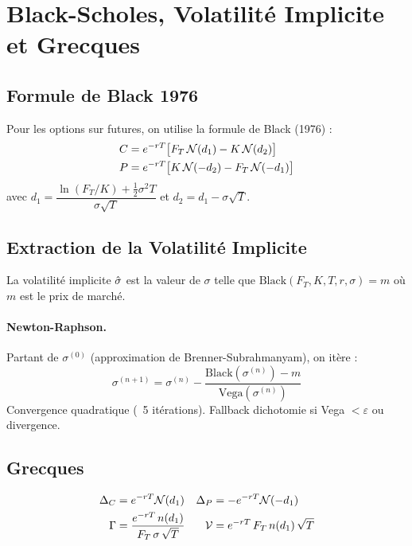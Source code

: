 \section{Black-Scholes, Volatilité Implicite et Grecques}
\label{sec:bs_iv}

\subsection{Formule de Black 1976}

Pour les options sur futures, on utilise la formule de Black (1976) :
\begin{align}
  C &= e^{-rT}\bigl[F_T\,\mathcal{N}(d_1) - K\,\mathcal{N}(d_2)\bigr] \label{eq:black_call}\\
  P &= e^{-rT}\bigl[K\,\mathcal{N}(-d_2) - F_T\,\mathcal{N}(-d_1)\bigr] \label{eq:black_put}
\end{align}
avec $d_1 = \dfrac{\ln(F_T/K) + \frac{1}{2}\sigma^2 T}{\sigma\sqrt{T}}$ et
$d_2 = d_1 - \sigma\sqrt{T}$.

\subsection{Extraction de la Volatilité Implicite}

La volatilité implicite $\hat{\sigma}$ est la valeur de $\sigma$ telle que
$\text{Black}(F_T, K, T, r, \sigma) = m$ où $m$ est le prix de marché.

\paragraph{Newton-Raphson.} Partant de $\sigma^{(0)}$ (approximation de
Brenner-Subrahmanyam), on itère :
\begin{equation}
  \sigma^{(n+1)} = \sigma^{(n)} - \frac{\text{Black}(\sigma^{(n)}) - m}{\text{Vega}(\sigma^{(n)})}
\end{equation}
Convergence quadratique (~5 itérations). Fallback dichotomie si Vega $< \varepsilon$
ou divergence.

\subsection{Grecques}

\begin{align}
  \Delta_C &= e^{-rT}\mathcal{N}(d_1) & \Delta_P &= -e^{-rT}\mathcal{N}(-d_1)\\
  \Gamma   &= \frac{e^{-rT}\,n(d_1)}{F_T\,\sigma\,\sqrt{T}} &
  \mathcal{V} &= e^{-rT}\,F_T\,n(d_1)\,\sqrt{T}
\end{align}

